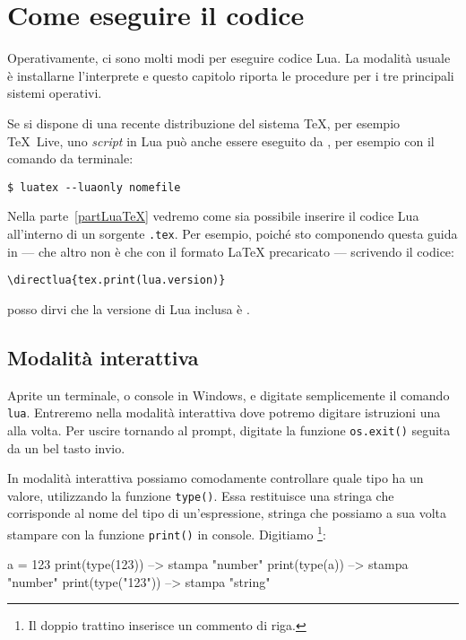 \section{Come eseguire il codice}

Operativamente, ci sono molti modi per eseguire codice Lua. La modalità usuale
è installarne l'interprete e questo capitolo riporta le procedure per i tre
principali sistemi operativi.

Se si dispone di una recente distribuzione del sistema \TeX{}, per esempio
TeX~Live, uno \emph{script} in Lua può anche essere eseguito da \LuaTeX{}, per
esempio con il comando da terminale:
\begin{Verbatim}
$ luatex --luaonly nomefile
\end{Verbatim}

Nella parte~\ref{partLuaTeX} vedremo come sia possibile inserire il codice Lua
all'interno di un sorgente \texttt{.tex}. Per esempio, poiché sto componendo
questa guida in \LuaLaTeX{} --- che altro non è che \LuaTeX{} con il formato
\LaTeX{} precaricato --- scrivendo il codice:
\begin{Verbatim}
\directlua{tex.print(lua.version)}
\end{Verbatim}
posso dirvi che la versione di Lua inclusa è .


\subsection{Modalità interattiva}

Aprite un terminale, o console in Windows, e digitate semplicemente il comando
\texttt{lua}. Entreremo nella modalità interattiva dove potremo
digitare istruzioni una alla volta. Per uscire tornando al prompt, digitate la
funzione \texttt{os.exit()} seguita da un bel tasto invio.

In modalità interattiva possiamo comodamente controllare quale tipo ha un
valore, utilizzando la funzione \texttt{type()}. Essa restituisce una stringa
che corrisponde al nome del tipo di un'espressione, stringa che possiamo a sua
volta stampare con la funzione \texttt{print()} in console. Digitiamo
\footnote{Il doppio trattino inserisce un commento di riga.}:
\begin{lines}
a = 123
print(type(123))    --> stampa "number"
print(type(a))      --> stampa "number"
print(type("123"))  --> stampa "string"
\end{lines}



